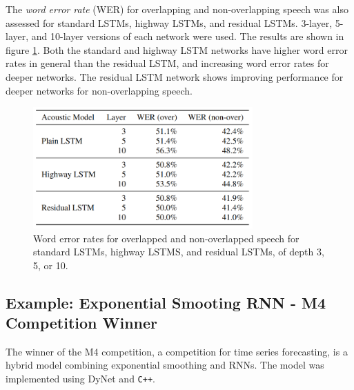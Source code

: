 \documentclass[a4paper,12pt]{article}
\theoremstyle{definition}
\begin{document}
The \textit{word error rate} (WER) for overlapping and non-overlapping speech was also assessed for standard LSTMs, highway LSTMs, and residual LSTMs. 3-layer, 5-layer, and 10-layer versions of each network were used. The results are shown in figure \ref{fig:wer}. Both the standard and highway LSTM networks have higher word error rates in general than the residual LSTM, and increasing word error rates for deeper networks. The residual LSTM network shows improving performance for deeper networks for non-overlapping speech.

\begin{figure}
	\centering
	\includegraphics[width=0.75\textwidth]{figures/wer.png}
	\caption{Word error rates for overlapped and non-overlapped speech for standard LSTMs, highway LSTMS, and residual LSTMs, of depth 3, 5, or 10.}
	\label{fig:wer}
\end{figure}

\subsection{Example: Exponential Smooting RNN - M4 Competition Winner \cite{smyl}}
The winner of the M4 competition, a competition for time series forecasting, is a hybrid model combining exponential smoothing and RNNs. The model was implemented using DyNet and \texttt{C++}.
\end{document}
